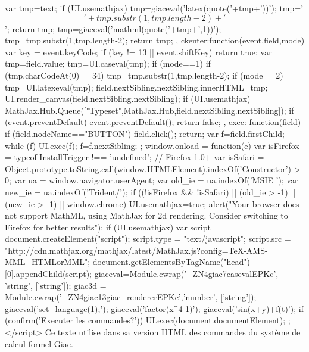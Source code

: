 {{{{    var tmp=text;
     if (UI.usemathjax){
       tmp=giaceval('latex(quote('+tmp+'))');
       tmp='$$'+tmp.substr(1,tmp.length-2)+'$$';
       return tmp;
     }
     tmp=giaceval('mathml(quote('+tmp+',1))');
     tmp=tmp.substr(1,tmp.length-2);
    return tmp;   
  },
  ckenter:function(event,field,mode){
    var key = event.keyCode;
    if (key != 13 || event.shiftKey) return true;
    var tmp=field.value;
    tmp=UI.caseval(tmp);
    if (mode==1){
      if (tmp.charCodeAt(0)==34) tmp=tmp.substr(1,tmp.length-2); 
   }
   if (mode==2){
     tmp=UI.latexeval(tmp);
   }
   field.nextSibling.nextSibling.innerHTML=tmp;
   UI.render_canvas(field.nextSibling.nextSibling);
   if (UI.usemathjax) MathJax.Hub.Queue(["Typeset",MathJax.Hub,field.nextSibling.nextSibling]);
   if (event.preventDefault) event.preventDefault();
    return false;
  },
  exec: function(field){
     if (field.nodeName=="BUTTON"){
        field.click();
        return;
     }
     var f=field.firstChild;
     while (f){
       UI.exec(f);
       f=f.nextSibling;
     }
   }
 };
 window.onload = function(e){
   var isFirefox = typeof InstallTrigger !== 'undefined';   // Firefox 1.0+
   var isSafari = Object.prototype.toString.call(window.HTMLElement).indexOf('Constructor') > 0;
  var ua = window.navigator.userAgent;
  var old_ie = ua.indexOf('MSIE ');
  var new_ie = ua.indexOf('Trident/');
  if ((!isFirefox && !isSafari) || (old_ie > -1) || (new_ie > -1) || window.chrome){
     UI.usemathjax=true;
     alert("Your browser does not support MathML, using MathJax for 2d rendering. Consider switching to Firefox for better results");
  }
  if (UI.usemathjax){
    var script = document.createElement("script");
    script.type = "text/javascript";
    script.src  = "http://cdn.mathjax.org/mathjax/latest/MathJax.js?config=TeX-AMS-MML_HTMLorMML";
    document.getElementsByTagName("head")[0].appendChild(script);
  }
  giaceval=Module.cwrap('_ZN4giac7casevalEPKc',  'string', ['string']);
  giac3d = Module.cwrap('_ZN4giac13giac_rendererEPKc','number', ['string']);
  giaceval('set_language(1);');
  giaceval('factor(x^4-1)');
  giaceval('sin(x+y)+f(t)');
 if (confirm('Executer les commandes?')) UI.exec(document.documentElement);
 };
</script>
}
\else
 Ce texte utilise dans sa version HTML des commandes du syst\`eme de calcul formel Giac.
\fi
}
\ifhevea
\newenvironment{giacprog}{
\verbatim}
{\endverbatim 
\@print{<button onclick="var field=parentNode.previousSibling; var tmp=field.innerHTML;if(tmp.length==0) tmp=field.value;var t=createElement('TEXTAREA');t.style.fontSize=16;t.cols=60;t.rows=10;t.value=tmp;tmp=UI.caseval(tmp);if (tmp.charCodeAt(0)==34) tmp=tmp.substr(1,tmp.length-2);nextSibling.innerHTML=tmp; UI.render_canvas(nextSibling.innerHTML);field.parentNode.insertBefore(t,field);field.parentNode.removeChild(field);">ok</button><span></span><br>
}
}
\else
\newenvironment{giacprog}
{
\VerbatimEnvironment
\begin{Verbatim}
}
{
\end{Verbatim}
}
\fi

